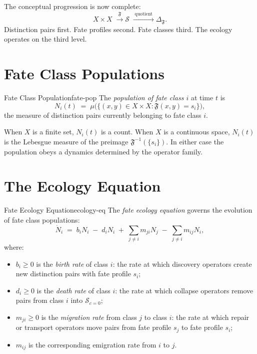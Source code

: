 \documentclass[12pt,twoside,openright]{book}
\newcommand{\fateClasses}{\Delta_{\mathfrak{F}}}
\newcommand{\fateMap}{\mathfrak{F}}
\newcommand{\fateSpace}{\mathcal{S}}
\newcommand{\collapseInd}{c}             %
\newcommand{\fatePop}[1]{N_{#1}(t)}
\newcommand{\fateComp}[1]{\fateSpace_{\collapseInd=#1}}
\providecommand{\fateComp}[1]{\fateSpace_{\collapseInd=#1}}
\providecommand{\fateClasses}{\Delta_{\mathfrak{F}}}
\providecommand{\fatePop}[1]{N_{#1}(t)}
\begin{document}
The conceptual progression is now complete:
\[
  X\times X
  \;\xrightarrow{\;\fateMap\;}
  \fateSpace
  \;\xrightarrow{\;\text{quotient}\;}
  \fateClasses.
\]
Distinction pairs first. Fate profiles second. Fate classes
third. The ecology operates on the third level.

\section{Fate Class Populations}

\begin{definition}{Fate Class Population}{fate-pop}
The \emph{population of fate class $i$} at time $t$ is
\[
  \fatePop{i}
  \;=\;
  \mu\bigl(\{(x,y)\in X\times X:
  \fateMap(x,y)=s_i\}\bigr),
\]
the measure of distinction pairs currently belonging to
fate class $i$.
\end{definition}

When $X$ is a finite set, $\fatePop{i}$ is a count. When $X$
is a continuous space, $\fatePop{i}$ is the Lebesgue measure
of the preimage $\fateMap^{-1}(\{s_i\})$. In either case the
population obeys a dynamics determined by the operator family.

\section{The Ecology Equation}

\begin{definition}{Fate Ecology Equation}{ecology-eq}
The \emph{fate ecology equation} governs the evolution of
fate class populations:
\begin{equation}
  \dot{N}_i
  \;=\;
  b_i N_i
  \;-\;
  d_i N_i
  \;+\;
  \sum_{j\neq i} m_{ji}N_j
  \;-\;
  \sum_{j\neq i} m_{ij}N_i,
  \label{eq:ecology}
\end{equation}
where:
\begin{itemize}[nosep,leftmargin=2em]
  \item $b_i\ge 0$ is the \emph{birth rate} of class $i$:
    the rate at which discovery operators create new distinction
    pairs with fate profile $s_i$;
  \item $d_i\ge 0$ is the \emph{death rate} of class $i$:
    the rate at which collapse operators remove pairs from
    class $i$ into $\fateComp{0}$;
  \item $m_{ji}\ge 0$ is the \emph{migration rate} from
    class $j$ to class $i$: the rate at which repair or
    transport operators move pairs from fate profile $s_j$
    to fate profile $s_i$;
  \item $m_{ij}$ is the corresponding emigration rate from
    $i$ to $j$.
\end{itemize}
\end{definition}
\end{document}
